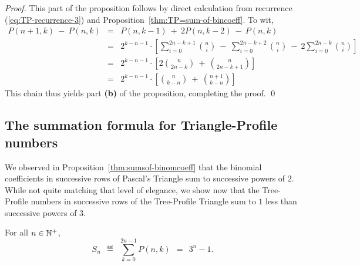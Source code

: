 \begin{proof}
This part of the proposition follows by direct calculation from
recurrence (\ref{eq:TP-recurrence-3}) and
Proposition~\ref{thm:TP=sum-of-bincoeff}.  To wit,
\begin{eqnarray*}
P(n+1, k) \ - \ P(n, k)
  & = &
P(n, k-1) \ + \ 2 P(n, k-2) \ - \ P(n,k) \\
  & = &
2^{k-n-1} \cdot \left[
\sum_{i=0}^{2n-k+1} {n \choose i}
 \ - \ \sum_{i=0}^{2n-k+2} {n \choose i}
 \ - \ 2 \sum_{i=0}^{2n-k} {n \choose i}
\right] \\
  & = & 
2^{k-n-1} \cdot \left[
  2 {n \choose {2n-k}} \ + \ {n \choose {2n-k+1}} \right] \\
  & = &
2^{k-n-1} \cdot \left[
   {n \choose {k-n}} \ + \ {{n+1} \choose {k-n}} \right]
\end{eqnarray*}
This chain thus yields part {\bf (b)} of the proposition, completing
the proof.
\qed
\end{proof}

\subsection{The summation formula for Triangle-Profile numbers}

We observed in Proposition~\ref{thm:sumsof-binomcoeff} that the
binomial coefficients in successive rows of Pascal's Triangle sum to
successive powers of $2$.  While not quite matching that level of
elegance, we show now that the Tree-Profile numbers in successive rows
of the Tree-Profile Triangle sum to $1$ less than successive powers of
$3$.

\begin{prop}
\label{thm:TP-summation}
For all $n \in \mathbb{N}^+$,
\begin{equation}
\label{eq:TP-summation}
S_n \ \ \eqdef \ \ \sum_{k=0}^{2n-1} P(n,k) \ \ = \ \ 3^n -1.
\end{equation}
\end{prop}
 
